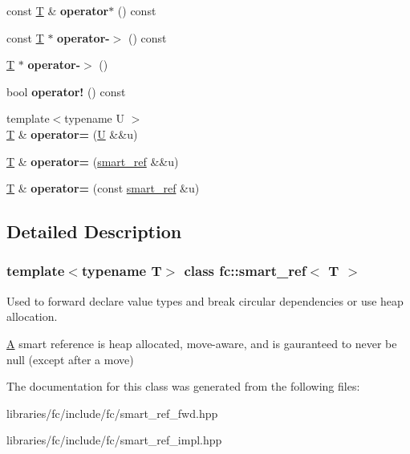 \begin{DoxyCompactItemize}
const \mbox{\hyperlink{struct_t}{T}} \& {\bfseries operator$\ast$} () const
\item 
\mbox{\label{classfc_1_1smart__ref_a927275f4dabdbd3aff7e75d66592d90e}} 
const \mbox{\hyperlink{struct_t}{T}} $\ast$ {\bfseries operator-\/$>$} () const
\item 
\mbox{\label{classfc_1_1smart__ref_a16312f22568a2761ea1712c9dd7fd9e6}} 
\mbox{\hyperlink{struct_t}{T}} $\ast$ {\bfseries operator-\/$>$} ()
\item 
\mbox{\label{classfc_1_1smart__ref_a9b2e3c27fb0a1aa0c9e48bc5a8e44255}} 
bool {\bfseries operator!} () const
\item 
\mbox{\label{classfc_1_1smart__ref_af96d5dd0a6f8d8a88e75623a7ddd7245}} 
{\footnotesize template$<$typename U $>$ }\\\mbox{\hyperlink{struct_t}{T}} \& {\bfseries operator=} (\mbox{\hyperlink{union_u}{U}} \&\&u)
\item 
\mbox{\label{classfc_1_1smart__ref_ae63151aab15ce078897005b499d05ba8}} 
\mbox{\hyperlink{struct_t}{T}} \& {\bfseries operator=} (\mbox{\hyperlink{classfc_1_1smart__ref}{smart\+\_\+ref}} \&\&u)
\item 
\mbox{\label{classfc_1_1smart__ref_ad5d5363d5624fbe557dea765c5fffaaa}} 
\mbox{\hyperlink{struct_t}{T}} \& {\bfseries operator=} (const \mbox{\hyperlink{classfc_1_1smart__ref}{smart\+\_\+ref}} \&u)
\end{DoxyCompactItemize}


\subsection{Detailed Description}
\subsubsection*{template$<$typename T$>$\newline
class fc\+::smart\+\_\+ref$<$ T $>$}

Used to forward declare value types and break circular dependencies or use heap allocation. 

\mbox{\hyperlink{struct_a}{A}} smart reference is heap allocated, move-\/aware, and is gauranteed to never be null (except after a move) 

The documentation for this class was generated from the following files\+:\begin{DoxyCompactItemize}
\item 
libraries/fc/include/fc/smart\+\_\+ref\+\_\+fwd.\+hpp\item 
libraries/fc/include/fc/smart\+\_\+ref\+\_\+impl.\+hpp\end{DoxyCompactItemize}
